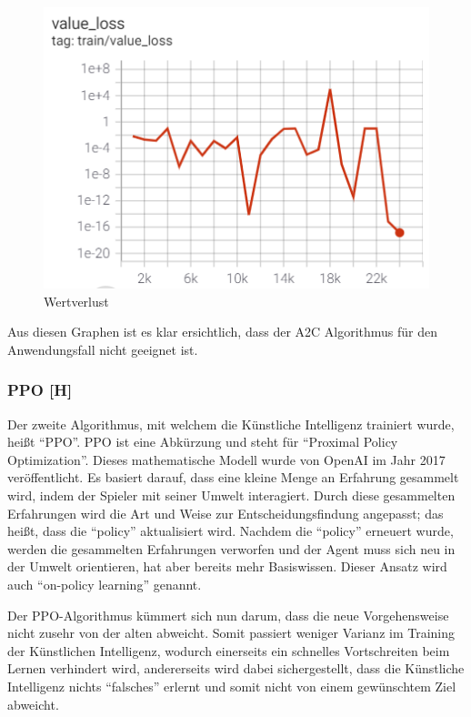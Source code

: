 \begin{figure}[H]
    \centering
    \includegraphics[scale=0.7]{pics/Tensorboard/A2C/value_loss_new.png}
    \caption{Wertverlust}
    \label{fig:a2c:valueLoss}
\end{figure}

Aus diesen Graphen ist es klar ersichtlich, dass der A2C Algorithmus für den Anwendungsfall nicht geeignet ist.

\subsubsection{PPO [H]}\label{maai:ppo:head}
Der zweite Algorithmus, mit welchem die Künstliche Intelligenz trainiert wurde, heißt ``PPO''.
PPO ist eine Abkürzung und steht für ``Proximal Policy Optimization''. Dieses mathematische Modell
wurde von OpenAI im Jahr 2017 veröffentlicht. Es basiert darauf, dass eine kleine Menge an Erfahrung gesammelt wird, indem der Spieler mit seiner Umwelt interagiert.
Durch diese gesammelten Erfahrungen wird die Art und Weise zur Entscheidungsfindung angepasst; das heißt, dass die ``policy'' aktualisiert wird.
Nachdem die ``policy'' erneuert wurde, werden die gesammelten Erfahrungen verworfen und der Agent muss sich neu in der Umwelt orientieren, hat aber bereits mehr Basiswissen.
Dieser Ansatz wird auch ``on-policy learning'' genannt.

Der PPO-Algorithmus kümmert sich nun darum, dass die neue Vorgehensweise nicht zusehr von der alten abweicht.
Somit passiert weniger Varianz im Training der Künstlichen Intelligenz, wodurch einerseits ein schnelles Vortschreiten
beim Lernen verhindert wird, andererseits wird dabei sichergestellt, dass die Künstliche Intelligenz nichts ``falsches''
erlernt und somit nicht von einem gewünschtem Ziel abweicht.

